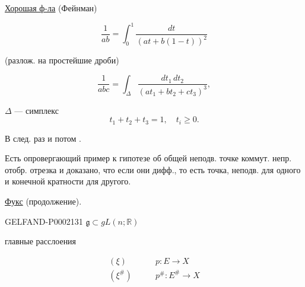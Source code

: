 \underline{\underline{Хорошая ф-ла}} (Фейнман)



\begin{equation*}\frac{1}{ab}=\int_0^1\frac{dt}{(at+b(1-t))^2}\end{equation*}



(разлож. на простейшие дроби)



\begin{equation*}\frac{1}{abc}=\int_\Delta\frac{dt_1\,dt_2}{(at_1+bt_2+ct_3)^3},\end{equation*}



$\Delta$ --- симплекс
\begin{equation*}t_1+t_2+t_3=1,\quad t_i\geq0.\end{equation*}



В след. раз  и потом .



Есть опровергающий пример к гипотезе об общей неподв. точке коммут. непр. отобр. отрезка и доказано,
что если они дифф., то есть точка, неподв. для одного и конечной кратности для другого.





\underline{Фукс} (продолжение).



\begin{GelfandAdjacentEvidence}{GELFAND-P000213}{1}
$\mathfrak g\subset gL(n;\mathbb R)$
\end{GelfandAdjacentEvidence}

главные расслоения



\begin{equation*}\begin{aligned}(\xi)&\qquad p:E\longrightarrow X\\(\xi^{\#})&\qquad p^{\#}:E^{\#}\longrightarrow X\end{aligned}\end{equation*}



